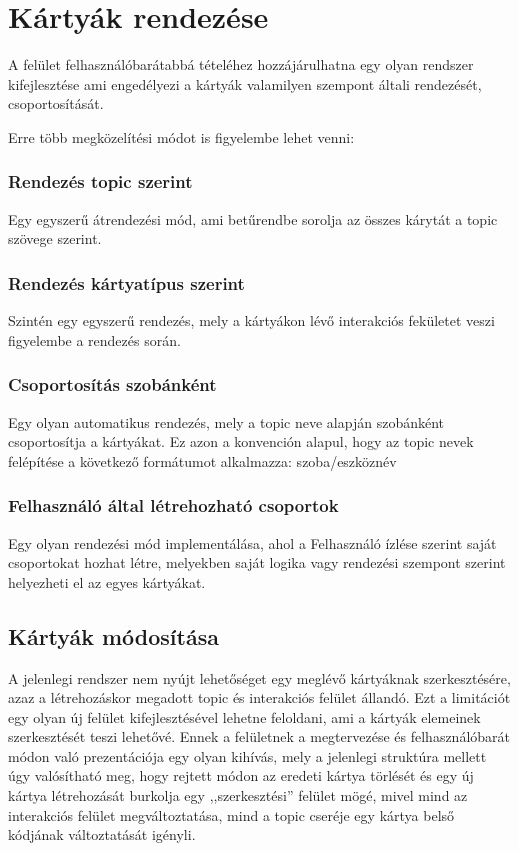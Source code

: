 \documentclass[]{thesis-ekf}
\theoremstyle{definition}
\theoremstyle{remark}
\begin{document}
\section{Kártyák rendezése}
A felület felhasználóbarátabbá tételéhez hozzájárulhatna egy olyan rendszer kifejlesztése ami engedélyezi a
kártyák valamilyen szempont általi rendezését, csoportosítását.

Erre több megközelítési módot is figyelembe lehet venni:

\subsubsection{Rendezés topic szerint}
Egy egyszerű átrendezési mód, ami betűrendbe sorolja az összes kárytát a topic szövege szerint.

\subsubsection{Rendezés kártyatípus szerint}
Szintén egy egyszerű rendezés, mely a kártyákon lévő interakciós fekületet veszi figyelembe a rendezés során.

\subsubsection{Csoportosítás szobánként}
Egy olyan automatikus rendezés, mely a topic neve alapján szobánként csoportosítja a kártyákat.
Ez azon a konvención alapul, hogy az topic nevek felépítése a következő formátumot alkalmazza: szoba/eszköznév

\subsubsection{Felhasználó által létrehozható csoportok}
Egy olyan rendezési mód implementálása, ahol a Felhasználó ízlése szerint saját csoportokat hozhat létre, 
melyekben saját logika vagy rendezési szempont szerint helyezheti el az egyes kártyákat.

\subsection{Kártyák módosítása}
A jelenlegi rendszer nem nyújt lehetőséget egy meglévő kártyáknak szerkesztésére, azaz a létrehozáskor megadott
topic és interakciós felület állandó. Ezt a limitációt egy olyan új felület kifejlesztésével
lehetne feloldani, ami a kártyák elemeinek szerkesztését teszi lehetővé. Ennek a felületnek a megtervezése
és felhasználóbarát módon való prezentációja egy olyan kihívás, mely a jelenlegi struktúra mellett
úgy valósítható meg, hogy rejtett módon az eredeti kártya törlését és egy új kártya létrehozását burkolja
egy ,,szerkesztési'' felület mögé, mivel mind az interakciós felület megváltoztatása, mind a topic cseréje
egy kártya belső kódjának változtatását igényli.
\end{document}
